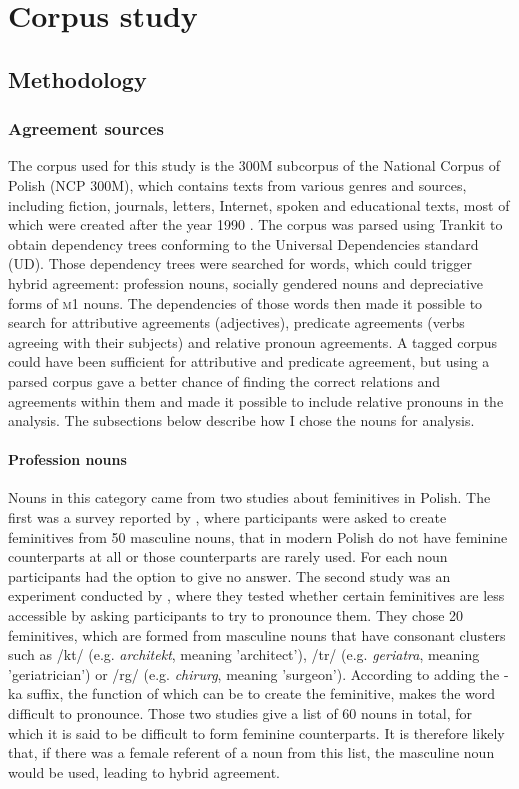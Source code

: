 \chapter{Corpus study}

\startcontents[chapters]

\section{Methodology}
\subsection{Agreement sources}
The corpus used for this study is the 300M subcorpus of the National Corpus of Polish (NCP 300M), which contains texts from various genres and sources, including fiction, journals, letters, Internet, spoken and educational texts, most of which were created after the year 1990 \citep{przepiorkowski_narodowy_2012}. The corpus was parsed using Trankit \citep{nguyen_trankit_2021} to obtain dependency trees conforming to the Universal Dependencies standard (UD). Those dependency trees were searched for words, which could trigger hybrid agreement: profession nouns, socially gendered nouns and depreciative forms of \textsc{m1} nouns. The dependencies of those words then made it possible to search for attributive agreements (adjectives), predicate agreements (verbs agreeing with their subjects) and relative pronoun agreements. A tagged corpus could have been sufficient for attributive and predicate agreement, but using a parsed corpus gave a better chance of finding the correct relations and agreements within them and made it possible to include relative pronouns in the analysis. The subsections below describe how I chose the nouns for analysis.

\subsubsection{Profession nouns}
Nouns in this category came from two studies about feminitives in Polish. The first was a survey reported by \cite{szpyra-kozlowska_premiera_2019}, where participants were asked to create feminitives from 50 masculine nouns, that in modern Polish do not have feminine counterparts at all or those counterparts are rarely used. For each noun participants had the option to give no answer. The second study was an experiment conducted by \cite{szpyra-kozlowska_czy_2022}, where they tested whether certain feminitives are less accessible by asking participants to try to pronounce them. They chose 20 feminitives, which are formed from masculine nouns that have consonant clusters such as /kt/ (e.g. \textsl{architekt}, meaning 'architect'), /tr/ (e.g. \textsl{geriatra}, meaning 'geriatrician') or /rg/ (e.g. \textsl{chirurg}, meaning 'surgeon'). According to \cite{klemensiewicz_tytuly_1957} adding the -ka suffix, the function of which can be to create the feminitive, makes the word difficult to pronounce. Those two studies give a list of 60 nouns in total, for which it is said to be difficult to form feminine counterparts. It is therefore likely that, if there was a female referent of a noun from this list, the masculine noun would be used, leading to hybrid agreement. 

